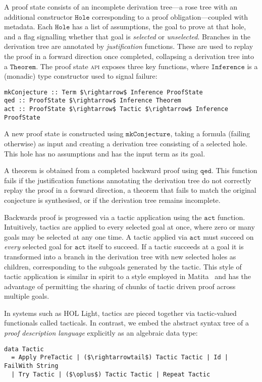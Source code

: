 \documentclass{llncs}
\begin{document}
A proof state consists of an incomplete derivation tree---a rose tree with an additional constructor $\mathtt{Hole}$ corresponding to a proof obligation---coupled with metadata.
Each $\mathtt{Hole}$ has a list of assumptions, the goal to prove at that hole, and a flag signalling whether that goal is \emph{selected} or \emph{unselected}.
Branches in the derivation tree are annotated by \emph{justification} functions.
These are used to replay the proof in a forward direction once completed, collapsing a derivation tree into a $\mathtt{Theorem}$.
The proof state \textsc{api} exposes three key functions, where $\mathtt{Inference}$ is a (monadic) type constructor used to signal failure:
\begin{lstlisting}
mkConjecture :: Term $\rightarrow$ Inference ProofState
qed :: ProofState $\rightarrow$ Inference Theorem
act :: ProofState $\rightarrow$ Tactic $\rightarrow$ Inference ProofState
\end{lstlisting}

A new proof state is constructed using $\mathtt{mkConjecture}$, taking a formula (failing otherwise) as input and creating a derivation tree consisting of a selected hole.
This hole has no assumptions and has the input term as its goal.

A theorem is obtained from a completed backward proof using $\mathtt{qed}$.
This function fails if the justification functions annotating the derivation tree do not correctly replay the proof in a forward direction, a theorem that fails to match the original conjecture is synthesised, or if the derivation tree remains incomplete.

Backwards proof is progressed via a tactic application using the $\mathtt{act}$ function.
Intuitively, tactics are applied to every selected goal at once, where zero or many goals may be selected at any one time.
A tactic applied via $\mathtt{act}$ must succeed on \emph{every} selected goal for $\mathtt{act}$ itself to succeed.
If a tactic succeeds at a goal it is transformed into a branch in the derivation tree with new selected holes as children, corresponding to the subgoals generated by the tactic.
This style of tactic application is similar in spirit to a style employed in Matita~\cite{asperti:matita:2011} and has the advantage of permitting the sharing of chunks of tactic driven proof across multiple goals.

In systems such as HOL Light, tactics are pieced together via tactic-valued functionals called tacticals.
In contrast, we embed the abstract syntax tree of a \emph{proof description language} explicitly as an algebraic data type:
\begin{lstlisting}
data Tactic
  = Apply PreTactic | ($\rightarrowtail$) Tactic Tactic | Id | FailWith String
  | Try Tactic | ($\oplus$) Tactic Tactic | Repeat Tactic
\end{lstlisting}
\end{document}
